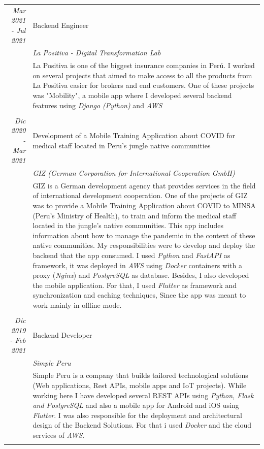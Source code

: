 \documentclass[a4paper,10pt]{article}
\begin{document}
\begin{longtable}{r|p{11cm}}
  \emph{Mar 2021 - Jul 2021} & Backend Engineer\\& \emph{La Positiva - Digital Transformation Lab}\\ & \footnotesize{La Positiva is one of the biggest insurance companies in Perú. I worked on several projects that aimed to make access to all the products from La Positiva easier for brokers and end customers. One of these projects was "Mobility", a mobile app where I developed several backend features using \emph{ Django (Python)} and \emph{AWS}}\\&\\
  \emph{Dic 2020 - Mar 2021} & Development of a Mobile Training Application about COVID for medical staff located in Peru's jungle native communities\\& \emph{GIZ (German Corporation for International Cooperation GmbH)}\\ & \footnotesize{GIZ is a German development agency that provides services in the field of international development cooperation. One of the projects of GIZ was to provide a Mobile Training Application about COVID to MINSA (Peru's Ministry of Health), to train and inform the medical staff located in the jungle's native communities. This app includes information about how to manage the pandemic in the context of these native communities. My responsibilities were to develop and deploy the backend that the app consumed. I used \emph{Python} and \emph{FastAPI} as framework, it was deployed in \emph{AWS} using \emph{Docker} containers with a proxy (\emph{Nginx}) and \emph{PostgreSQL} as database. Besides, I also developed the mobile application. For that, I used \emph{Flutter} as framework and synchronization and caching techniques, Since the app was meant to work mainly in offline mode.}\\&\\
  \emph{Dic 2019 - Feb 2021} & Backend Developer \\&\emph{Simple Peru}\\&\footnotesize{Simple Peru is a company that builds tailored technological solutions (Web applications, Rest APIs, mobile apps and IoT projects). While working here I have developed several REST APIs using \emph{Python, Flask and PostgreSQL} and also a mobile app for Android and iOS using \emph{Flutter}. I was also responsible for the deployment and architectural design of the Backend Solutions. For that i used \emph{Docker} and the cloud services of \emph{AWS}.}\\&\\

\end{longtable}
\end{document}
